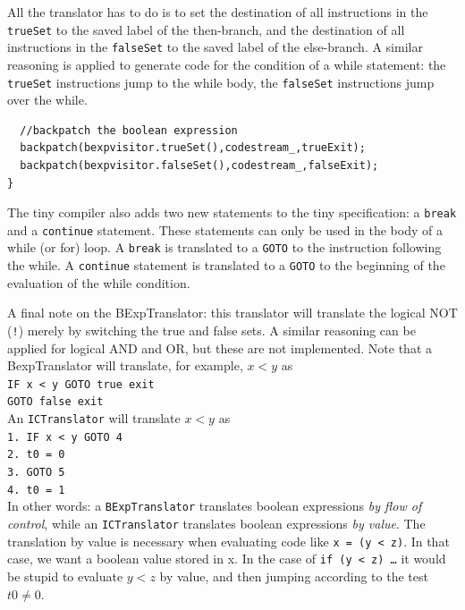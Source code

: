 \documentclass[a4paper]{article}
\begin{document}
All the translator has to do is to set the destination of all instructions in
the \texttt{trueSet} to the saved label of the then-branch, and the
destination of all instructions in the \texttt{falseSet} to the saved label of
the else-branch. A similar reasoning is applied to generate code for the
condition of a while statement: the \texttt{trueSet} instructions jump to the while
body, the \texttt{falseSet} instructions jump over the while.

\begin{verbatim}
  //backpatch the boolean expression
  backpatch(bexpvisitor.trueSet(),codestream_,trueExit);
  backpatch(bexpvisitor.falseSet(),codestream_,falseExit);
}
\end{verbatim}

The tiny compiler also adds two new statements to the tiny specification: a
\texttt{break} and a \texttt{continue} statement. These statements can only be used in the body of a while (or for) loop. A \texttt{break} is translated to a \texttt{GOTO} to the instruction following the while. A \texttt{continue} statement is translated to a \texttt{GOTO} to the beginning of the evaluation of the while condition.

A final note on the BExpTranslator: this translator will translate the
logical NOT (\texttt{!}) merely by switching the true and false sets. A
similar reasoning can be applied for logical AND and OR, but these are not
implemented. Note that a BexpTranslator will translate, for example, $x < y$ as\\
\texttt{IF x < y GOTO true exit}\\
\texttt{GOTO false exit}\\

An \texttt{ICTranslator} will translate $x < y$ as\\
\texttt{1. IF x < y GOTO 4}\\
\texttt{2. t0 = 0}\\
\texttt{3. GOTO 5}\\
\texttt{4. t0 = 1}\\

In other words: a \texttt{BExpTranslator} translates boolean expressions
\textsl{by flow of control}, while an \texttt{ICTranslator} translates boolean
expressions \textsl{by value}. The translation by value is necessary when
evaluating code like \texttt{x = (y < z)}. In that case, we want a boolean
value stored in x. In the case of \texttt{if (y < z) \ldots{}} it would be
stupid to evaluate $y<z$ by value, and then jumping according to the test
$t0 \neq 0$.
\end{document}
